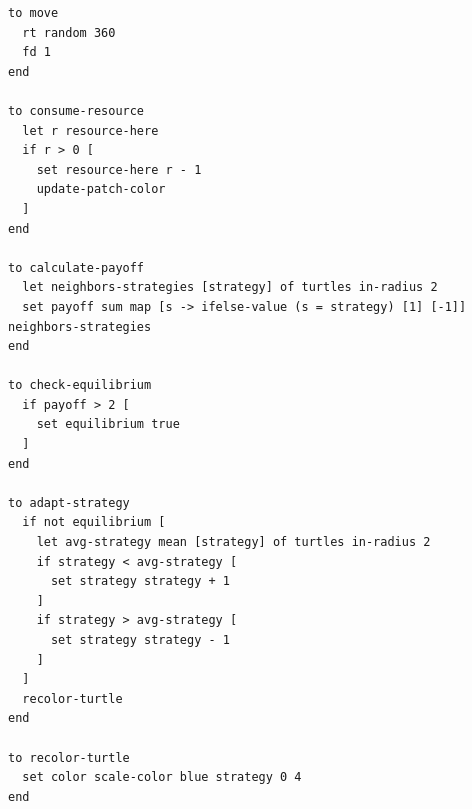 \documentclass[sn-nature]{sn-jnl}%
\theoremstyle{thmstyleone}%
\theoremstyle{thmstyletwo}%
\theoremstyle{thmstylethree}%
\begin{document}
\begin{lstlisting}
to move
  rt random 360
  fd 1
end

to consume-resource
  let r resource-here
  if r > 0 [
    set resource-here r - 1
    update-patch-color
  ]
end

to calculate-payoff
  let neighbors-strategies [strategy] of turtles in-radius 2
  set payoff sum map [s -> ifelse-value (s = strategy) [1] [-1]] neighbors-strategies
end

to check-equilibrium
  if payoff > 2 [
    set equilibrium true
  ]
end

to adapt-strategy
  if not equilibrium [
    let avg-strategy mean [strategy] of turtles in-radius 2
    if strategy < avg-strategy [
      set strategy strategy + 1
    ]
    if strategy > avg-strategy [
      set strategy strategy - 1
    ]
  ]
  recolor-turtle
end

to recolor-turtle
  set color scale-color blue strategy 0 4
end
\end{lstlisting}








\end{document}
